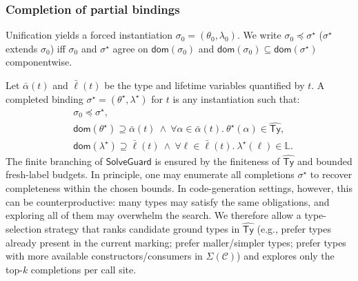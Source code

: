 \documentclass[runningheads]{llncs}
\newcommand{\dom}{\mathsf{dom}}
\newcommand{\SolveGuard}{\mathsf{SolveGuard}}
\begin{document}
\subsubsection{Completion of partial bindings}
Unification yields a forced instantiation $\sigma_0=(\theta_0,\lambda_0)$.
We write $\sigma_0 \preceq \sigma^\star$ ($\sigma^\star$ extends $\sigma_0$) iff $\sigma_0$ and $\sigma^\star$ agree on $\dom(\sigma_0)$ and $\dom(\sigma_0)\subseteq \dom(\sigma^\star)$ componentwise.

Let $\bar\alpha(t)$ and $\bar\ell(t)$ be the type and lifetime variables quantified by $t$. A completed binding $\sigma^\star=(\theta^\star,\lambda^\star)$ for $t$ is any instantiation such that:
\begin{align*}
&\sigma_0 \preceq \sigma^\star,\\
&\dom(\theta^\star)\supseteq \bar\alpha(t)\ \wedge\ \forall \alpha\in \bar\alpha(t).\ \theta^\star(\alpha)\in \widehat{\mathsf{Ty}},\\
&\dom(\lambda^\star)\supseteq \bar\ell(t)\ \wedge\ \forall \ell\in \bar\ell(t).\ \lambda^\star(\ell)\in \mathbb{L}.
\end{align*}
The finite branching of $\SolveGuard$ is ensured by the finiteness of $\widehat{\mathsf{Ty}}$ and bounded fresh-label budgets. In principle, one may enumerate all completions $\sigma^\star$ to recover completeness within the chosen bounds. In code-generation settings, however, this can be counterproductive: many types may satisfy the same obligations, and exploring all of them may overwhelm the search. We therefore allow a type-selection strategy that ranks candidate ground types in $\widehat{\mathsf{Ty}}$
(e.g., prefer types already present in the current marking; prefer maller/simpler types; prefer types with more available constructors/consumers in $\Sigma(\mathcal{C})$) and explores only the top-$k$ completions per call site.
\end{document}
